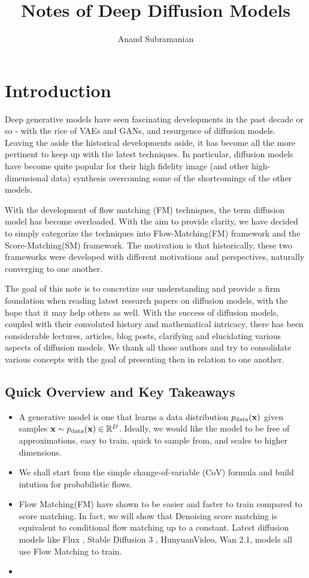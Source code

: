 \documentclass[a4paper, 11pt]{article}
\title{Notes of Deep Diffusion Models}
\author{Anand Subramanian}
\date{}
\begin{document}
 
\maketitle

\tableofcontents

\section{Introduction}
Deep generative models have seen fascinating developments in the past decade or so - with the rice of VAEs and GANs, and resurgence of diffusion models. Leaving the aside the historical developments aside, it has become all the more pertinent to keep up with the latest techniques. In particular, diffusion models have become quite popular for their high fidelity image (and other high-dimensional data) synthesis overcoming some of the shortcomings of the other models.

With the development of flow matching (FM) techniques, the term diffusion model has become overloaded. With the aim to provide clarity, we have decided to simply categorize the techniques into Flow-Matching(FM) framework and the Score-Matching(SM) framework. The motivation is that historically, these two frameworks were developed with different motivations and perspectives, naturally converging to one another. 

The goal of this note is to concretize our understanding and provide a firm foundation when reading latest research papers on diffusion models, with the hope that it may help others as well.
With the success of diffusion models, coupled with their convoluted history and mathematical intricacy, there has been considerable lectures, articles, blog posts, clarifying and elucidating various aspects of diffusion models. We thank all those authors and try to consolidate various concepts with the goal of presenting then in relation to one another.

\subsection{Quick Overview and Key Takeaways}
\begin{itemize}
    \item A generative model is one that learns a data distribution $p_{\text{data}}(\mbox{$\mbox{$\mathbf{x}$}$})$ given samples $\mbox{$\mbox{$\mathbf{x}$}$} \sim p_{\text{data}}(\mbox{$\mbox{$\mathbf{x}$}$}) \in \mathbb{R}^{D}$. Ideally, we would like the model to be free of approximations, easy to train, quick to sample from, and scales to higher dimensions.
    \item We shall start from the simple change-of-variable (CoV) formula and build intution for probabilistic flows.
    \item Flow Matching(FM) have shown to be easier and faster to train compared to score matching. In fact, we will show that Denoising score matching is equivalent to conditional flow matching up to a constant. Latest diffusion models like Flux \citep{flux2024}, Stable Diffusion 3 \citep{esser2024scaling}, HunyuanVideo, Wan 2.1, models all use Flow Matching to train.
    \item 
\end{itemize}
\end{document}
